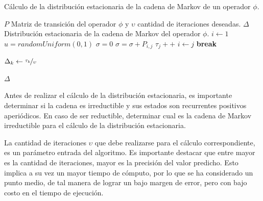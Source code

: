 \begin{algorithm}[!t]
	\caption{Cálculo de la distribución estacionaria de la cadena de Markov de un operador $\phi$.}
	\label{alg:distEstacionaria}
	\begin{algorithmic}[1]
	\REQUIRE $P$ Matriz de transición del operador $\phi$ y $\upsilon$ cantidad de iteraciones deseadas.
	\ENSURE $\Delta$ Distribución estacionaria de la cadena de Markov del operador $\phi$.
	\STATE $i \leftarrow 1$
		\STATE $u = randomUniform(0,1)$
		\STATE $\sigma = 0$
			\STATE $\sigma = \sigma + P_{i,j}$
				\STATE $\tau_{j}++$
				\STATE $i \leftarrow j$
				\STATE \textbf{break}
			\ENDIF
		\ENDFOR
	\ENDFOR

		\STATE $\Delta_{k} \leftarrow \nicefrac{\tau_{k}}{\upsilon}$
	\ENDFOR	
	
	\RETURN $\Delta$
	
	\end{algorithmic}
\end{algorithm}


\normalsize{Antes de realizar el cálculo de la distribución estacionaria, es importante determinar si la cadena es irreductible y sus estados son recurrentes positivos aperiódicos. En caso de ser reductible, determinar cual es la cadena de Markov irreductible para el cálculo de la distribución estacionaria.}

La cantidad de iteraciones $\upsilon$ que debe realizarse para el cálculo correspondiente, es un parámetro entrada del algoritmo. Es importante destacar que entre mayor es la cantidad de iteraciones, mayor es la precisión del valor predicho. Esto implica a su vez un mayor tiempo de cómputo, por lo que se ha considerado un punto medio, de tal manera de lograr un bajo margen de error, pero con bajo costo en el tiempo de ejecución. %

